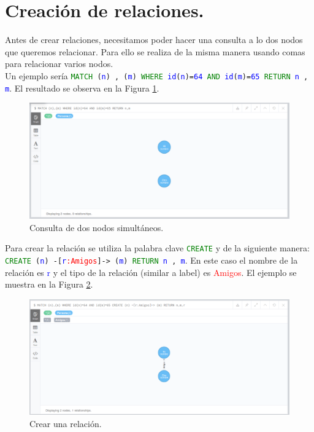\documentclass[conference]{IEEEtran}
\begin{document}
\section{Creación de relaciones.}

Antes de crear relaciones, necesitamos poder hacer una consulta a lo dos nodos que queremos relacionar. Para ello se realiza de la misma manera usando comas para relacionar varios nodos. 
\\
Un ejemplo sería \texttt{\textcolor{green}{MATCH} (\textcolor{blue}{n}) , (\textcolor{blue}{m}) \textcolor{green}{WHERE} \textcolor{blue}{id}(\textcolor{blue}{n})=\textcolor{blue}{64} \textcolor{green}{AND} \textcolor{blue}{id}(\textcolor{blue}{m})=\textcolor{blue}{65}  \textcolor{green}{RETURN} \textcolor{blue}{n} , \textcolor{blue}{m}}. El resultado se observa en la Figura \ref{fig33}.

\begin{figure}[H]
\begin{center}
\includegraphics[width= 0.45 \textwidth]{query_two1.png}
\end{center}
\caption{Consulta de dos nodos simultáneos.}
\label{fig33}
\end{figure}


Para crear la relación se utiliza la palabra clave \texttt{\textcolor{green}{CREATE}} y de la siguiente manera: \texttt{\textcolor{green}{CREATE} (\textcolor{blue}{n}) -[\textcolor{blue}{r}\textcolor{red}{:Amigos}]-> (\textcolor{blue}{m}) \textcolor{green}{RETURN} \textcolor{blue}{n} , \textcolor{blue}{m}}. En este caso el nombre de la relación es \textcolor{blue}{r} y el tipo de la relación (similar a label) es \textcolor{red}{Amigos}. El ejemplo se muestra en la Figura \ref{fig34}.


\begin{figure}[H]
\begin{center}
\includegraphics[width= 0.45 \textwidth]{relation_create1.png}
\end{center}
\caption{Crear una relación.}
\label{fig34}
\end{figure}
\end{document}
